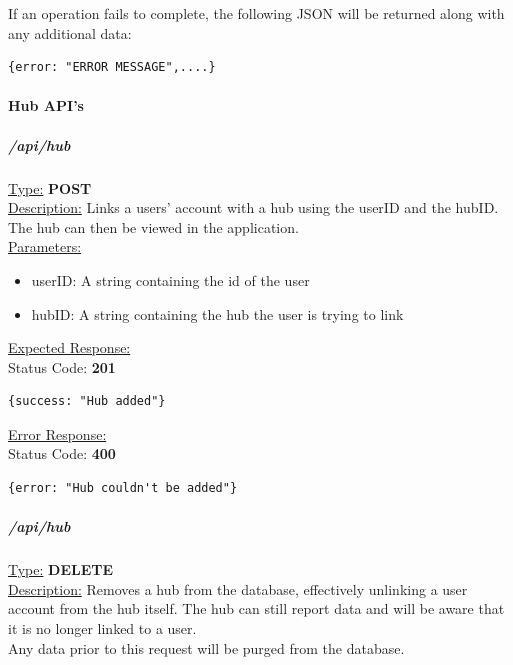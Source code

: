 \documentclass[draft,preprint,12pt,3p]{elsarticle}
\newcommand{\forceindent}{\leavevmode{\parindent=1em\indent}}
\begin{document}
If an operation fails to complete, the following JSON will be returned along with any additional data:\\[5pt]
\begin{verbatim}
{error: "ERROR MESSAGE",....}
\end{verbatim}


\paragraph{Hub API's}
\subparagraph*{/api/hub}
\underline{Type:} \textbf{POST}\\

\underline{Description:} Links a users' account with a hub using the userID and the hubID. The hub can then be viewed in the application.\\

\underline{Parameters:}
\begin{itemize}
\item userID: A string containing the id of the user

\item hubID: A string containing the hub the user is trying to link
\end{itemize}
\underline{Expected Response:}\\[5pt]
\forceindent Status Code: \textbf{201} \\
\begin{verbatim}
{success: "Hub added"}
\end{verbatim}

\underline{Error Response:}\\[5pt]
\forceindent Status Code: \textbf{400} \\
\begin{verbatim}
{error: "Hub couldn't be added"}
\end{verbatim}



\subparagraph*{/api/hub}
\underline{Type:} \textbf{DELETE}\\

\underline{Description:} Removes a hub from the database, effectively unlinking a user account from the hub itself. The hub can still report data and will be aware that it is no longer linked to a user.\\
Any data prior to this request will be purged from the database.\\
\end{document}
